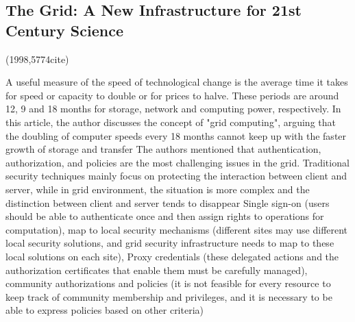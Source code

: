 \documentclass[a4paper,twoside]{scrbook}
\begin{document}
\subsection{The Grid: A New Infrastructure for 21st Century Science \cite{foster2002grid}}
(1998,5774cite)\par
A useful measure of the speed of technological change is the average time it takes for speed or capacity to double or for prices to halve. These periods are around 12, 9 and 18 months for storage, network and computing power, respectively.
In this article, the author discusses the concept of "grid computing", arguing that the doubling of computer speeds every 18 months cannot keep up with the faster growth of storage and transfer
The authors mentioned that authentication, authorization, and policies are the most challenging issues in the grid. Traditional security techniques mainly focus on protecting the interaction between client and server, while in grid environment, the situation is more complex and the distinction between client and server tends to disappear
Single sign-on (users should be able to authenticate once and then assign rights to operations for computation), map to local security mechanisms (different sites may use different local security solutions, and grid security infrastructure needs to map to these local solutions on each site), Proxy credentials (these delegated actions and the authorization certificates that enable them must be carefully managed), community authorizations and policies (it is not feasible for every resource to keep track of community membership and privileges, and it is necessary to be able to express policies based on other criteria)
\end{document}
